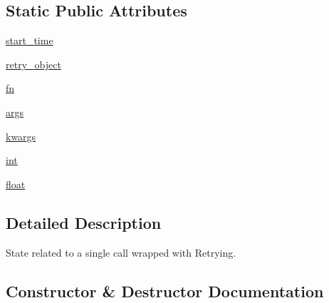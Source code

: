 \subsection*{Static Public Attributes}
\begin{DoxyCompactItemize}
\item 
\hyperlink{classpip_1_1__vendor_1_1tenacity_1_1RetryCallState_ac3428488f702dbd79ada0ea5e16f6f9d}{start\+\_\+time}
\item 
\hyperlink{classpip_1_1__vendor_1_1tenacity_1_1RetryCallState_a96aa4e59f71d78a34569ba15b5e3b0db}{retry\+\_\+object}
\item 
\hyperlink{classpip_1_1__vendor_1_1tenacity_1_1RetryCallState_a784592906d31c66702e6bff5bfcffcb2}{fn}
\item 
\hyperlink{classpip_1_1__vendor_1_1tenacity_1_1RetryCallState_af945258bad647b4be99f509628811b59}{args}
\item 
\hyperlink{classpip_1_1__vendor_1_1tenacity_1_1RetryCallState_a5c01b0ac2d5c80396247d3b2e913b4c3}{kwargs}
\item 
\hyperlink{classpip_1_1__vendor_1_1tenacity_1_1RetryCallState_a1d4eeee743e615c13965764eb50ba497}{int}
\item 
\hyperlink{classpip_1_1__vendor_1_1tenacity_1_1RetryCallState_a0caa7e2785c2734017debe93a05ee478}{float}
\end{DoxyCompactItemize}


\subsection{Detailed Description}
\begin{DoxyVerb}State related to a single call wrapped with Retrying.\end{DoxyVerb}
 

\subsection{Constructor \& Destructor Documentation}
\mbox{\label{classpip_1_1__vendor_1_1tenacity_1_1RetryCallState_ac93573518a16c96f428383cb2c502d39}} 
